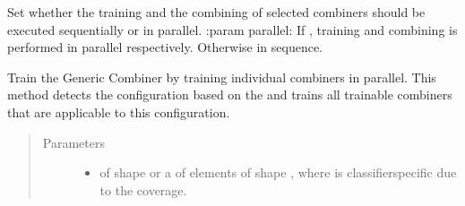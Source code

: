 \documentclass[letterpaper,10pt,english]{sphinxmanual}
\begin{document}
\begin{fulllineitems}
\begin{fulllineitems}
\begin{quote}
\begin{description}
\end{description}\end{quote}

\end{fulllineitems}


\begin{fulllineitems}
\label{\detokenize{pusion.auto.auto_combiner:pusion.auto.auto_combiner.AutoCombiner.set_parallel}}
\sphinxAtStartPar
Set whether the training and the combining of selected combiners should be executed sequentially or in parallel.
:param parallel: If , training and combining is performed in parallel respectively. Otherwise in sequence.

\end{fulllineitems}


\begin{fulllineitems}
\label{\detokenize{pusion.auto.auto_combiner:pusion.auto.auto_combiner.AutoCombiner.train_par}}
\sphinxAtStartPar
Train the Generic Combiner by training individual combiners in parallel.
This method detects the configuration based on the  and trains all trainable combiners
that are applicable to this configuration.
\begin{quote}\begin{description}
\item[{Parameters}] \leavevmode\begin{itemize}
\item {} 
\sphinxAtStartPar
{} \textendash{} 
\sphinxAtStartPar
{} of shape  or a  of
 elements of shape , where  is classifier\sphinxhyphen{}specific
due to the coverage.


\end{itemize}
\end{description}
\end{quote}
\end{fulllineitems}
\end{fulllineitems}
\end{document}
